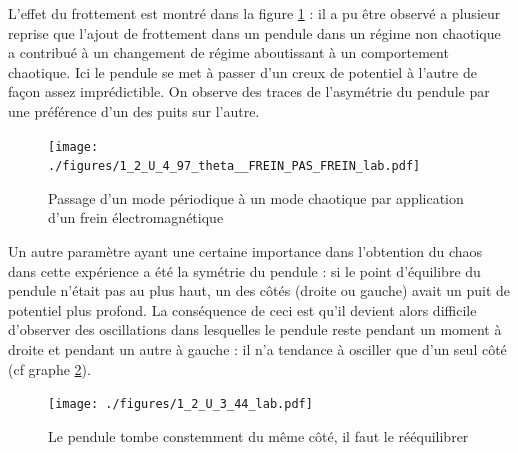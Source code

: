 \documentclass[a4paper,12pt,oneside]{article}
\begin{document}
L'effet du frottement est montré dans la figure \ref{fig:1_2_U_4_97_theta__FREIN_PAS_FREIN_lab} : il a pu être observé a plusieur reprise que l'ajout de frottement dans un pendule dans un régime non chaotique a contribué à un changement de régime aboutissant à un comportement chaotique. Ici le pendule se met à passer d'un creux de potentiel à l'autre de façon assez imprédictible. On observe des traces de l'asymétrie du pendule par une préférence d'un des puits sur l'autre.

\begin{figure}[h!]
  \begin{center}
  \texttt{[image: ./figures/1\_2\_U\_4\_97\_theta\_\_FREIN\_PAS\_FREIN\_lab.pdf]}
  \caption{Passage d'un mode périodique à un mode chaotique par application d'un frein électromagnétique} \label{fig:1_2_U_4_97_theta__FREIN_PAS_FREIN_lab}
  \end{center}
\end{figure}


Un autre paramètre ayant une certaine importance dans l'obtention du chaos dans cette expérience a été la symétrie du pendule : si le point d'équilibre du pendule n'était pas au plus haut, un des côtés (droite ou gauche) avait un puit de potentiel plus profond. La conséquence de ceci est qu'il devient alors difficile d'observer des oscillations dans lesquelles le pendule reste pendant un moment à droite et pendant un autre à gauche : il n'a tendance à osciller que d'un seul côté (cf graphe \ref{fig:1_2_U_3_44_lab}). 


\begin{figure}[h!]
  \begin{center}
  \texttt{[image: ./figures/1\_2\_U\_3\_44\_lab.pdf]}
  \caption{Le pendule tombe constemment du même côté, il faut le rééquilibrer} \label{fig:1_2_U_3_44_lab}
  \end{center}
\end{figure}





\clearpage












\end{document}
